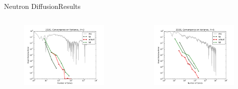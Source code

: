 \documentclass{beamer}
\begin{document}
\begin{frame}{Neutron Diffusion}{Results}\vspace{-20pt}
  \begin{columns}
  \begin{column}{0.3\textwidth}
    \begin{figure}[h!]
      \centering
      \includegraphics[width=\textwidth]{../../graphics/2D2G_varconv_3}
    \end{figure}
  \end{column}
  \begin{column}{0.3\textwidth}
    \begin{figure}[h!]
      \centering
      \includegraphics[width=\textwidth]{../../graphics/2D2G_varconv_5}

\end{figure}
\end{column}
\end{columns}
\end{frame}
\end{document}
